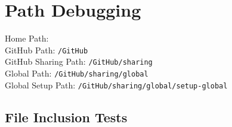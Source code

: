\documentclass{article}
\newcommand{\pGithub}{\HomePath/GitHub}
\newcommand{\pGithubSharing}{\pGithub/sharing}
\newcommand{\pGlobal}{\pGithubSharing/global}
\newcommand{\pGlobalSetup}{\pGlobal/setup-global}
\begin{document}
\section*{Path Debugging}
\noindent
Home Path: \texttt{\HomePath} \\ 
GitHub Path: \texttt{\pGithub} \\
GitHub Sharing Path: \texttt{\pGithubSharing} \\
Global Path: \texttt{\pGlobal} \\
Global Setup Path: \texttt{\pGlobalSetup} \\

\subsection*{File Inclusion Tests}
% 
\end{document}
